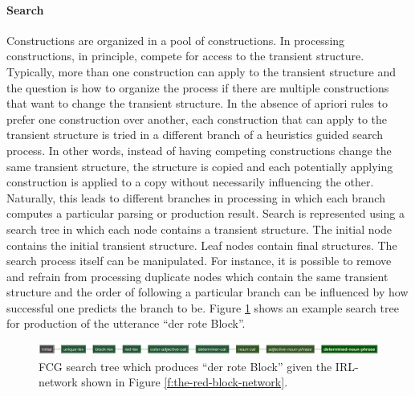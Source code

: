 \paragraph*{Search}
Constructions are organized in a pool of constructions. In
processing constructions, in principle, compete for access 
to the transient structure. Typically, more than one construction 
can apply to the transient structure and the question is how to organize
the process if there are multiple constructions that want to change
the transient structure. In the absence of apriori rules to 
prefer one construction over another, each construction that can 
apply to the transient structure is tried in a different branch of a 
heuristics guided search process. In other words, instead
of having competing constructions change the same transient
structure, the structure is copied and each potentially
applying construction is applied to a copy without necessarily 
influencing the other. Naturally, this leads to different
branches in processing in which each branch
computes a particular parsing or production result.
Search is represented using a search tree in which each
node contains a transient structure. The initial node 
contains the initial transient structure. Leaf nodes contain final structures.
The search process itself can be manipulated. 
For instance, it is possible to remove and refrain from processing 
duplicate nodes which contain the same transient structure
and the order of following a particular branch can be 
influenced by how successful one predicts the branch to be.
Figure \ref{f:fcg-search} shows an example search tree for 
production of the utterance ``der rote Block''.

\begin{figure}
\begin{center}
\includegraphics[width=1.0\columnwidth]{figs/der-rote-block-fcg-search}
\end{center}
\caption[FCG search tree in production]{FCG search tree which 
produces ``der rote Block'' given the IRL-network
shown in Figure \ref{f:the-red-block-network}.}
\label{f:fcg-search}
\end{figure}

